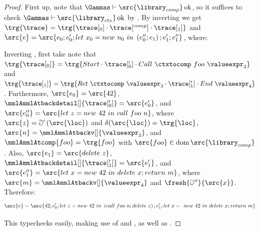 \documentclass[a4paper,names,dvipsnames]{article}
\begin{document}
\begin{proof}
  First up, note that $\Gammas\vdash\src{\library_{comp}}\operatorname{ok}$, so it suffices to check $\Gammas\vdash\src{\library_{ctx}}\operatorname{ok}$ by .
  By inverting  we get $\trg{\trace}=\trg{\trace[_{0}]\cdot\trace[^{comp}]\cdot\trace[_{1}]}$ and\\$\src{e}=\src{e_{0};e_{0}';let\ x_{0}=new\ n_{0}\ in\ \left(e_{0}'';e_{1}\right);e_{1}';e_{1}''}$, where:
  Inverting , first take note that\\$\trg{\trace[_0]}=\trg{Start\cdot\trace[_0']\cdot Call\ \ctxtocomp\ foo\ \valueexpr_2}$ and $\trg{\trace[_1]}=\trg{Ret\ \ctxtocomp\ \valueexpr_3\cdot\trace[_1']\cdot End\ \valueexpr_4}$.
  Furthermore, $\src{e_{0}}=\src{42}$, $\mmlAmmlAtbackdetail[]{\trace[_{0}']}=\src{e_{0}'}$, and $\src{e_0''}=\src{let\ z=new\ 42\ in\ call\ foo\ n}$, where $\src{z}=\Game'\left(\src{\loc}\right)$ and $\delta(\src{\loc})=\trg{\loc}$, $\src{n}=\mmlAmmlAtbackv[]{\valueexpr_{2}}$, and $\mmlAmmlAtcomp{foo}=\trg{foo}$ with $\src{foo}\in\operatorname{dom}\src{\library_{comp}}$.
  Also, $\src{e_{1}}=\src{delete\ z}$, $\mmlAmmlAtbackdetail[]{\trace[_{1}']}=\src{e_{1}'}$, and $\src{e_{1}''}=\src{let\ x = new\ 42\ in\ delete\ x;return\ m}$, where $\src{m}=\mmlAmmlAtbackv[]{\valueexpr_{4}}$ and $\fresh{\Game''}{\src{x}}$.
  Therefore: $$\src{e}=\src{42;e_{0}';let\ z=new\ 42\ in\ \left(call\ foo\ n; delete\ z\right);e_{1}';let\ x=\ new\ 42\ in\ delete\ x;return\ m}$$

  This typechecks easily, making use of  and , as well as .
\end{proof}
\end{document}
